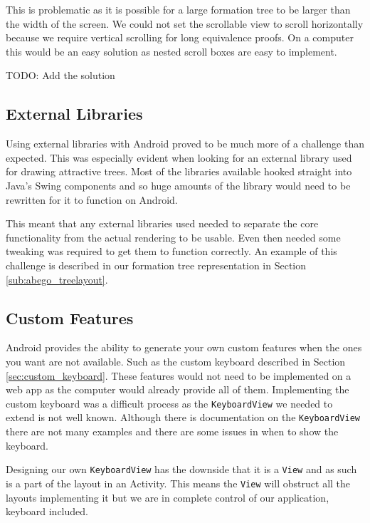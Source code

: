 \documentclass{report}
\begin{document}
This is problematic as it is possible for a large formation tree to be larger than the width of the screen. We could not set the scrollable view to scroll horizontally because we require vertical scrolling for long equivalence proofs. On a computer this would be an easy solution as nested scroll boxes are easy to implement.

TODO: Add the solution

\subsection{External Libraries}

Using external libraries with Android proved to be much more of a challenge than expected. This was especially evident when looking for an external library used for drawing attractive trees. Most of the libraries available hooked straight into Java's Swing components and so huge amounts of the library would need to be rewritten for it to function on Android.

This meant that any external libraries used needed to separate the core functionality from the actual rendering to be usable. Even then needed some tweaking was required to get them to function correctly. An example of this challenge is described in our formation tree representation in Section \ref{sub:abego_treelayout}.

\subsection{Custom Features}
\label{sub:custom_features}

Android provides the ability to generate your own custom features when the ones you want are not available. Such as the custom keyboard described in Section \ref{sec:custom_keyboard}. These features would not need to be implemented on a web app as the computer would already provide all of them. Implementing the custom keyboard was a difficult process as the {\tt KeyboardView} we needed to extend is not well known. Although there is documentation on the {\tt KeyboardView} there are not many examples and there are some issues in when to show the keyboard.

Designing our own {\tt KeyboardView} has the downside that it is a {\tt View} and as such is a part of the layout in an Activity. This means the {\tt View} will obstruct all the layouts implementing it but we are in complete control of our application, keyboard included.
\end{document}
